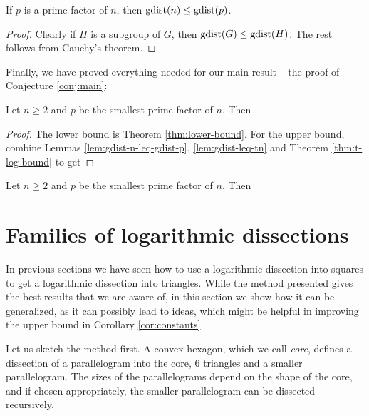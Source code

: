 \begin{lem}
\label{lem:gdist-n-leq-gdist-p}
If $p$ is a prime factor of $n$, then $\mathop{\mathrm{gdist}}(n) \leq \mathop{\mathrm{gdist}}(p)$.
\end{lem}%
\begin{proof}
Clearly if $H$ is a subgroup of $G$, then $\mathop{\mathrm{gdist}}(G) \leq \mathop{\mathrm{gdist}}(H)$. The rest follows from Cauchy's theorem.
\end{proof}

Finally, we have proved everything needed for our main result -- the proof of Conjecture \ref{conj:main}:

\begin{thm}
\label{cor:conj-proof}
Let $n \geq 2$ and $p$ be the smallest prime factor of $n$. Then
\end{thm}%
\begin{proof}
The lower bound is Theorem \ref{thm:lower-bound}. For the upper bound, combine Lemmas \ref{lem:gdist-n-leq-gdist-p}, \ref{lem:gdist-leq-tn} and Theorem \ref{thm:t-log-bound} to get
\end{proof}

\begin{cor}
\label{cor:constants}
Let $n \geq 2$ and $p$ be the smallest prime factor of $n$. Then
\end{cor}%

\section{Families of logarithmic dissections}
\label{sec:other-log-dissections}

In previous sections we have seen how to use a logarithmic dissection into squares to get a logarithmic dissection into triangles. While the method presented gives the best results that we are aware of, in this section we show how it can be generalized, as it can possibly lead to ideas, which might be helpful in improving the upper bound in Corollary \ref{cor:constants}.

Let us sketch the method first. A convex hexagon, which we call \emph{core}, defines a dissection of a parallelogram into the core, 6 triangles and a smaller parallelogram. The sizes of the parallelograms depend on the shape of the core, and if chosen appropriately, the smaller parallelogram can be dissected recursively.

